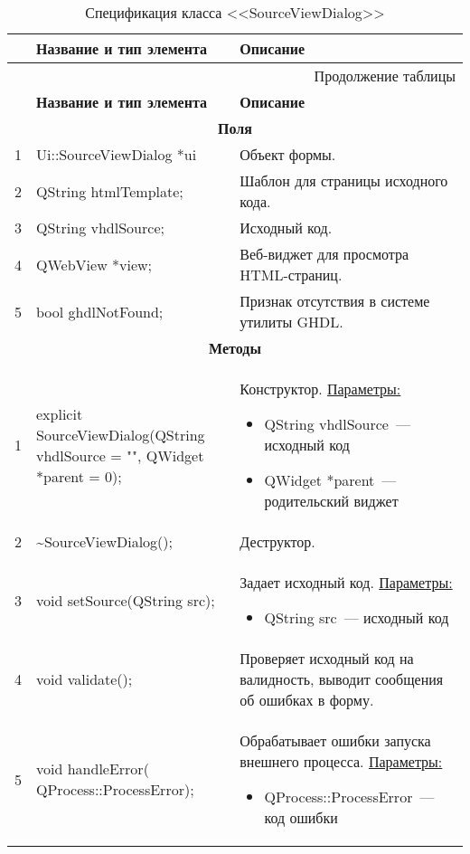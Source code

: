 \small
\singlespacing
\begin{longtable}[h]{|p{}|p{}|p{}|}
  \caption{Спецификация класса <<SourceViewDialog>>}
	\\ \hline
	  \textbf{\No}                  &
	  \textbf{Название и тип элемента}  &
	  \textbf{Описание}
	\\ \hline
  \endfirsthead

  \multicolumn{3}{r}{Продолжение таблицы \thetable{}}
  \\ \hline
	  \textbf{\No}                  &
	  \textbf{Название и тип элемента}  &
	  \textbf{Описание}
	\\ \hline
  \endhead

  \multicolumn{3}{|c|}{\textbf{Поля}} \\
  \hline
  1 & Ui::SourceViewDialog *ui & Объект формы. \\ \hline
  2 & QString htmlTemplate; & Шаблон для страницы исходного кода. \\ \hline
  3 & QString vhdlSource; & Исходный код. \\ \hline
  4 & QWebView *view; & Веб-виджет для просмотра HTML-страниц. \\ \hline
  5 & bool ghdlNotFound; & Признак отсутствия в системе утилиты GHDL. \\ \hline

  \multicolumn{3}{|c|}{\textbf{Методы}} \\
  \hline
  1 & explicit SourceViewDialog(QString vhdlSource = "", QWidget *parent = 0); &
    Конструктор.\newline
    \uline{Параметры:}
    \begin{itemize}[nolistsep,label=,leftmargin=0cm]
      \item QString vhdlSource~--- исходный код
      \item QWidget *parent~--- родительский виджет
    \end{itemize}\\ \hline
  2 & \textasciitilde SourceViewDialog(); & Деструктор. \\ \hline
  3 & void setSource(QString src); & Задает исходный код.\newline
    \uline{Параметры:}
    \begin{itemize}[nolistsep,label=,leftmargin=0cm]
      \item QString src~--- исходный код
    \end{itemize}\\ \hline
  4 & void validate(); & Проверяет исходный код на валидность, выводит сообщения об ошибках в форму. \\ \hline
  5 & void handleError( QProcess::ProcessError); & Обрабатывает ошибки запуска внешнего процесса.\newline
    \uline{Параметры:}
    \begin{itemize}[nolistsep,label=,leftmargin=0cm]
      \item QProcess::ProcessError~--- код ошибки
    \end{itemize}\\ \hline
\end{longtable}
\normalsize
\onehalfspacing


